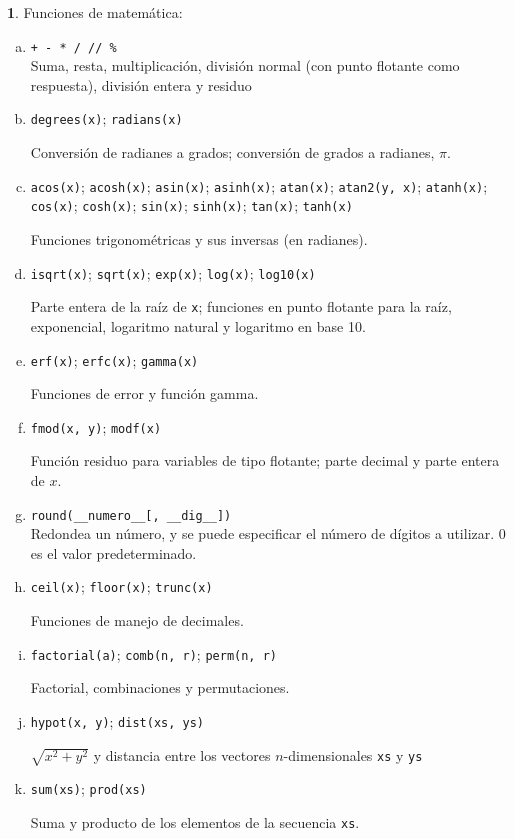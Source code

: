 \documentclass[12pt]{article}
\theoremstyle{definition}
\newtheorem{funcion}{}[section]
\begin{document}
\begin{funcion}
  Funciones de matem\'atica:
  \begin{enumerate}[a)]
    \item \verb|+ - * / // %| \\[1ex]
  Suma, resta, multiplicaci\'on, divisi\'on normal (con punto flotante como respuesta), divisi\'on entera y residuo

    \item \verb|degrees(x)|; \verb|radians(x)|

      Conversi\'on de radianes a grados; conversi\'on de grados a radianes, $\pi$.

\item \verb|acos(x)|;
      \verb|acosh(x)|;
      \verb|asin(x)|;
      \verb|asinh(x)|;
      \verb|atan(x)|;
      \verb|atan2(y, x)|;
      \verb|atanh(x)|;
      \verb|cos(x)|;
      \verb|cosh(x)|;
      \verb|sin(x)|;
      \verb|sinh(x)|;
      \verb|tan(x)|;
      \verb|tanh(x)|

      Funciones trigonom\'etricas y sus inversas (en radianes).

\item \verb|isqrt(x)|; \verb|sqrt(x)|; \verb|exp(x)|; \verb|log(x)|; \verb|log10(x)|

  Parte entera de la ra\'iz de \verb|x|; funciones en punto flotante para la ra\'iz, exponencial, logaritmo natural y logaritmo en base 10.

    \item \verb|erf(x)|; \verb|erfc(x)|; \verb|gamma(x)|

      Funciones de error y funci\'on gamma.

    \item \verb|fmod(x, y)|; \verb|modf(x)|
      
      Funci\'on residuo para variables de tipo flotante; parte decimal y parte entera de $x$.

\item \verb|round(__numero__[, __dig__])| \\[1ex]
  Redondea un n\'umero, y se puede especificar el n\'umero de d\'igitos a utilizar. 0 es el valor predeterminado.

    \item \verb|ceil(x)|;
      \verb|floor(x)|;
      \verb|trunc(x)|

      Funciones de manejo de decimales.

    \item \verb|factorial(a)|; \verb|comb(n, r)|; \verb|perm(n, r)|

      Factorial, combinaciones y permutaciones.

    \item \verb|hypot(x, y)|; \verb|dist(xs, ys)|

      $\sqrt{x^2+y^2}$ y distancia entre los vectores $n$-dimensionales  \verb|xs| y \verb|ys|

    \item \verb|sum(xs)|; \verb|prod(xs)|

      Suma y producto de los elementos de la secuencia \verb|xs|.

  \end{enumerate}
\end{funcion}
\end{document}
